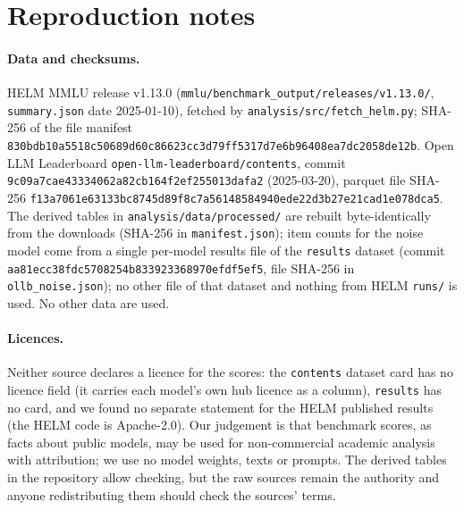 \section{Reproduction notes}\label{app:repro}
\paragraph{Data and checksums.}
HELM MMLU release v1.13.0 (\texttt{mmlu/benchmark\_output/\allowbreak releases/\allowbreak v1.13.0/}, \texttt{summary.json} date 2025-01-10), fetched by \texttt{analysis/src/fetch\_helm.py}; SHA-256 of the file manifest {\fontsize{8}{9.5}\selectfont\texttt{830bdb10a5518c50689d60c86623cc3d79ff5317d7e6b96408ea7dc2058de12b}}. Open LLM Leaderboard \texttt{open-llm-leaderboard/contents}, commit {\fontsize{8}{9.5}\selectfont\texttt{9c09a7cae43334062a82cb164f2ef255013dafa2}} (2025-03-20), parquet file SHA-256 {\fontsize{8}{9.5}\selectfont\texttt{f13a7061e63133bc8745d89f8c7a56148584940ede22d3b27e21cad1e078dca5}}. The derived tables in \texttt{analysis/data/processed/} are rebuilt byte-identically from the downloads (SHA-256 in \texttt{manifest.json}); item counts for the noise model come from a single per-model results file of the \texttt{results} dataset (commit {\fontsize{8}{9.5}\selectfont\texttt{aa81ecc38fdc5708254b833923368970efdf5ef5}}, file SHA-256 in \texttt{ollb\_noise.json}); no other file of that dataset and nothing from HELM \texttt{runs/} is used. No other data are used.

\paragraph{Licences.}
Neither source declares a licence for the scores: the \texttt{contents} dataset card has no licence field (it carries each model's own hub licence as a column), \texttt{results} has no card, and we found no separate statement for the HELM published results (the HELM code is Apache-2.0). Our judgement is that benchmark scores, as facts about public models, may be used for non-commercial academic analysis with attribution; we use no model weights, texts or prompts. The derived tables in the repository allow checking, but the raw sources remain the authority and anyone redistributing them should check the sources' terms.

